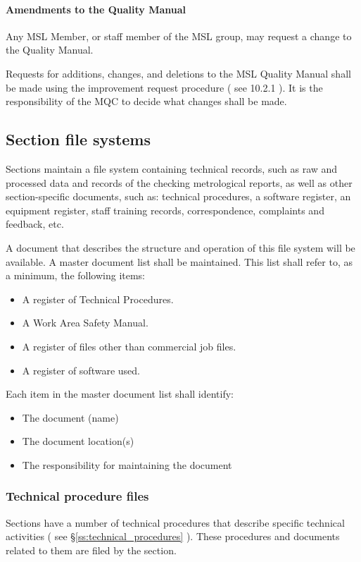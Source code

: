\paragraph{Amendments to the Quality Manual}
Any MSL Member, or staff member of the MSL group, may request a change to the Quality Manual. 

Requests for additions, changes, and deletions to the MSL Quality Manual shall be made using the improvement request procedure ( see 10.2.1 ).
It is the responsibility of the MQC to decide what changes shall be made.

\subsection{Section file systems}
\label{ss:section_file_systems}
Sections maintain a file system containing technical records, such as raw and processed data and records of the checking metrological reports, as well as other section-specific documents, such as: technical procedures, a software register, an equipment register, staff training records, correspondence, complaints and feedback, etc. 

A document that describes the structure and operation of this file system will be available. A master document list shall be maintained. This list shall refer to, as a minimum, the following items: 
\begin{itemize}
\item A register of Technical Procedures. 
\item A Work Area Safety Manual. 
\item A register of files other than commercial job files. 
\item A register of software used. 
\end{itemize}
Each item in the master document list shall identify:
\begin{itemize}
\item The document (name) 
\item The document location(s) 
\item The responsibility for maintaining the document
\end{itemize}

\subsubsection{Technical procedure files}
Sections have a number of technical procedures that describe specific technical activities ( see \S\ref{ss:technical_procedures} ). These procedures and documents related to them are filed by the section.
 
